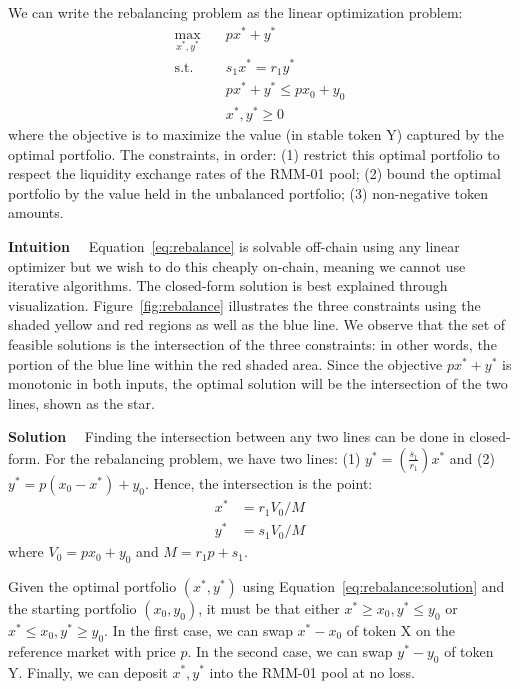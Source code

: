 \documentclass[hidelinks, 12pt]{article}
\begin{document}
We can write the rebalancing problem as the linear optimization problem:
\begin{equation}
    \begin{aligned}
        \max_{x^*, y^*}  \quad & p x^* + y^* \\
        \textrm{s.t.} \quad & s_1 x^* = r_1 y^* \\
        &  p x^* + y^* \leq p x_0 + y_0 \\
        & x^*, y^* \geq 0
    \end{aligned}
    \label{eq:rebalance}
\end{equation}
where the objective is to maximize the value (in stable token Y) captured by the optimal portfolio. The constraints, in order: (1) restrict this optimal portfolio to respect the liquidity exchange rates of the RMM-01 pool; (2) bound the optimal portfolio by the value held in the unbalanced portfolio; (3) non-negative token amounts.

\textbf{Intuition}$\quad$ Equation~\ref{eq:rebalance} is solvable off-chain using any linear optimizer but we wish to do this cheaply on-chain, meaning we cannot use iterative algorithms. The closed-form solution is best explained through visualization. Figure~\ref{fig:rebalance} illustrates the three constraints using the shaded yellow and red regions as well as the blue line. We observe that the set of feasible solutions is the intersection of the three constraints: in other words, the portion of the blue line within the red shaded area. Since the objective $p x^* + y^*$ is monotonic in both inputs, the optimal solution will be the intersection of the two lines, shown as the star.

\textbf{Solution}$\quad$ Finding the intersection between any two lines can be done in closed-form. For the rebalancing problem, we have two lines: (1) $y^* = \left(\frac{s_1}{r_1}\right)x^*$ and (2) $y^* = p(x_0 - x^*) + y_0$. Hence, the intersection is the point:
\begin{align}
    x^* &= r_1 V_0 / M \label{eq:rebalance:solution} \\
    y^* &= s_1 V_0 / M \nonumber
\end{align}
where $V_0 = px_0 + y_0$ and $M = r_1 p + s_1$.

Given the optimal portfolio $(x^*, y^*)$ using Equation~\ref{eq:rebalance:solution} and the starting portfolio $(x_0, y_0)$, it must be that either $x^* \geq x_0, y^* \leq y_0$ or $x^* \leq x_0, y^* \geq y_0$. In the first case, we can swap $x^* - x_0$ of token X on the reference market with price $p$. In the second case, we can swap $y^* - y_0$ of token Y. Finally, we can deposit $x^*, y^*$ into the RMM-01 pool at no loss.
\end{document}
